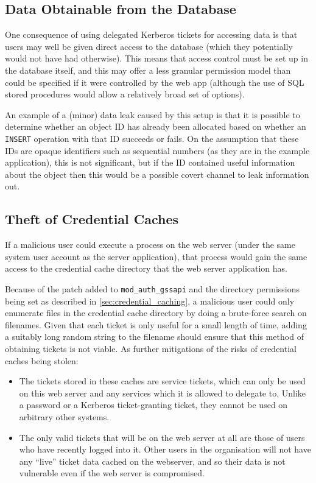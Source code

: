 \documentclass[12pt]{report}
\begin{document}
\subsection{Data Obtainable from the Database}
One consequence of using delegated Kerberos tickets for accessing data is that users may well be given direct access to the database (which they potentially would not have had otherwise). This means that access control must be set up in the database itself, and this may offer a less granular permission model than could be specified if it were controlled by the web app (although the use of SQL stored procedures would allow a relatively broad set of options).

An example of a (minor) data leak caused by this setup is that it is possible to determine whether an object ID has already been allocated based on whether an \texttt{INSERT} operation with that ID succeeds or fails. On the assumption that these IDs are opaque identifiers such as sequential numbers (as they are in the example application), this is not significant, but if the ID contained useful information about the object then this would be a possible covert channel to leak information out.

\subsection{Theft of Credential Caches}
\label{sec:theft_of_credential_caches}
If a malicious user could execute a process on the web server (under the same system user account as the server application), that process would gain the same access to the credential cache directory that the web server application has.

Because of the patch added to \verb+mod_auth_gssapi+ and the directory permissions being set as described in \autoref{sec:credential_caching}, a malicious user could only enumerate files in the credential cache directory by doing a brute-force search on filenames. Given that each ticket is only useful for a small length of time, adding a suitably long random string to the filename should ensure that this method of obtaining tickets is not viable. As further mitigations of the risks of credential caches being stolen:

\begin{itemize}
\item
  The tickets stored in these caches are service tickets, which can only be used on this web server and any services which it is allowed to delegate to. Unlike a password or a Kerberos ticket-granting ticket, they cannot be used on arbitrary other systems.
\item
  The only valid tickets that will be on the web server at all are those of users who have recently logged into it. Other users in the organisation will not have any ``live'' ticket data cached on the webserver, and so their data is not vulnerable even if the web server is compromised.
\end{itemize}
\end{document}
